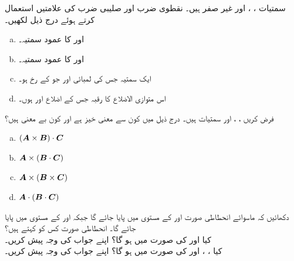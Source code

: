 سمتیات ، ،  اور  غیر صفر ہیں۔ نقطوی ضرب اور صلیبی ضرب کی علامتیں استعمال کرتے ہوئے درج ذیل لکھیں۔
\begin{enumerate}[a.]
\item
{} اور  کا عمود سمتیہ۔
\item
{} اور  کا عمود سمتیہ۔
\item
ایک سمتیہ جس کی لمبائی  اور جو  کے رخ ہو۔
\item
اس متوازی الاضلاع کا رقبہ جس کے اضلاع  اور  ہوں۔

\end{enumerate}
فرض کریں ، ،  اور  سمتیات ہیں۔ درج ذیل میں کون سے  معنی  خیز ہے اور کون بے معنی  ہیں؟
\begin{enumerate}[a.]
\item
$({{\boldsymbol{A}}}\times{\ensuremath{{\boldsymbol{B}}}})\cdot{\ensuremath{{\boldsymbol{C}}}}$
\item
${{\boldsymbol{A}}}\times({{\boldsymbol{B}}}\cdot{\ensuremath{{\boldsymbol{C}}}})$
\item
${{\boldsymbol{A}}}\times({{\boldsymbol{B}}}\times{\ensuremath{{\boldsymbol{C}}}})$
\item
${{\boldsymbol{A}}}\cdot({{\boldsymbol{B}}}\cdot{\ensuremath{{\boldsymbol{C}}}})$
\end{enumerate}
دکھائیں کہ ماسوائے انحطاطی صورت  اور  کے مستوی میں  پایا جائے گا جبکہ  اور  کے مستوی میں  پایا جائے گا۔ انحطاطی صورت کس کو کہتے ہیں؟
\\
کیا  اور  کی صورت میں  ہو گا؟ اپنے جواب کی وجہ پیش کریں۔ 
\\
کیا ،  ،  اور  کی صورت میں  ہو گا؟ اپنے جواب کی وجہ پیش کریں۔

